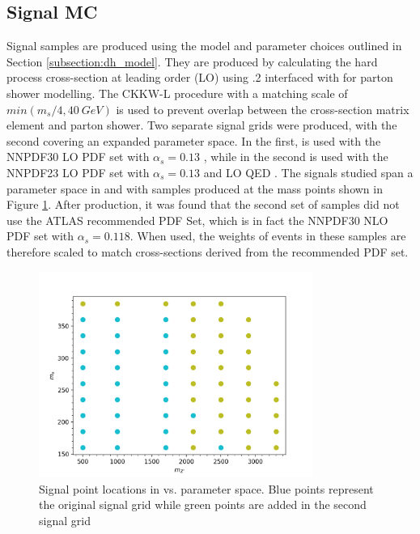 \subsection{Signal MC}
\label{subsection:mc_signal}
Signal samples are produced using the model and parameter choices outlined in Section \ref{subsection:dh_model}. They are produced by calculating the hard process cross-section at leading order (LO) using .2 \cite{MadGraph} interfaced with  \cite{Pythia} for parton shower modelling. The CKKW-L \cite{CKKW} procedure with a matching scale of $min(m_s/4, 40~GeV)$ is used to prevent overlap between the cross-section matrix element and parton shower. Two separate signal grids were produced, with the second covering an expanded parameter space. In the first, \mgamc is used with the NNPDF30 LO PDF set with $\alpha_s = 0.13$ \cite{PDF30}, while in the second \mgamc is used with the NNPDF23 LO PDF set with $\alpha_s = 0.13$ and LO QED \cite{PDF23}. The signals studied span a parameter space in \ms and \mZp with samples produced at the mass points shown in Figure \ref{fig:signal_grid}. After production, it was found that the second set of samples did not use the ATLAS recommended PDF Set, which is in fact the NNPDF30 NLO PDF set with $\alpha_s = 0.118$. When used, the weights of events in these samples are therefore scaled to match cross-sections derived from the recommended PDF set.

\begin{figure}[H]
    \centering
    \includegraphics[width=0.8\textwidth]{Figures/3/SignalGrid.png}
    \caption{Signal point locations in \ms vs. \mZp parameter space. Blue points represent the original signal grid while green points are added in the second signal grid}
    \label{fig:signal_grid}
\end{figure}

